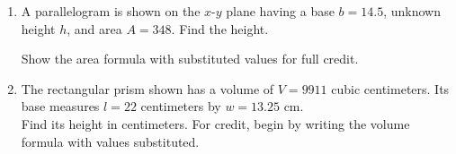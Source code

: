 \begin{enumerate}
\item A parallelogram is shown on the $x$-$y$ plane having a base $b=14.5$, unknown height $h$, and area $A=348$. Find the height. 
  \begin{multicols}{2}
    Show the area formula with substituted values for full credit.
      \begin{flushright}
      \end{flushright}
  \end{multicols} 

\item The rectangular prism shown has a volume of $V=9911$ cubic centimeters. Its base measures $l=22$ centimeters by $w=13.25$ cm. \\[0.5cm]
Find its height in centimeters. For credit, begin by writing the volume formula with values substituted.
\begin{flushright}
\end{flushright}


\end{enumerate}
